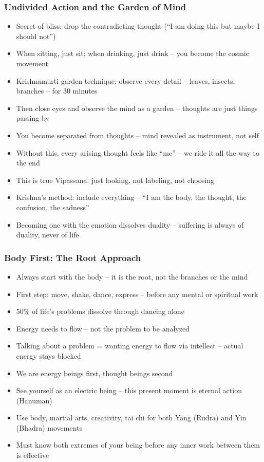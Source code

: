 \begin{frame}[fragile]\frametitle{Undivided Action and the Garden of Mind}
  \begin{itemize}
    \item Secret of bliss: drop the contradicting thought (``I am doing this but maybe I should not'')
    \item When sitting, just sit; when drinking, just drink -- you become the cosmic movement
    \item Krishnamurti garden technique: observe every detail -- leaves, insects, branches -- for 30 minutes
    \item Then close eyes and observe the mind as a garden -- thoughts are just things passing by
    \item You become separated from thoughts -- mind revealed as instrument, not self
    \item Without this, every arising thought feels like ``me'' -- we ride it all the way to the end
    \item This is true Vipassana: just looking, not labeling, not choosing
    \item Krishna's method: include everything -- ``I am the body, the thought, the confusion, the sadness''
    \item Becoming one with the emotion dissolves duality -- suffering is always of duality, never of life
  \end{itemize}
\end{frame}

\begin{frame}[fragile]\frametitle{Body First: The Root Approach}
  \begin{itemize}
    \item Always start with the body -- it is the root, not the branches or the mind
    \item First step: move, shake, dance, express -- before any mental or spiritual work
    \item 50\% of life's problems dissolve through dancing alone
    \item Energy needs to flow -- not the problem to be analyzed
    \item Talking about a problem = wanting energy to flow via intellect -- actual energy stays blocked
    \item We are energy beings first, thought beings second
    \item See yourself as an electric being -- this present moment is eternal action (Hanuman)
    \item Use body, martial arts, creativity, tai chi for both Yang (Rudra) and Yin (Bhadra) movements
    \item Must know both extremes of your being before any inner work between them is effective
  \end{itemize}
\end{frame}

